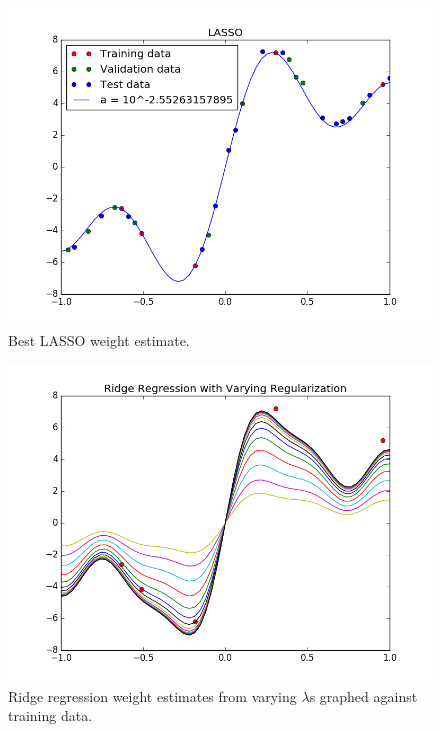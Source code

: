 \documentclass[a4paper,twoside]{article}
\begin{document}
\begin{figure}[b!]
  \includegraphics[width=\linewidth]{../Figures/P4/lasso_best.png}
  \caption{Best LASSO weight estimate.}
  \label{fig:lasso_best}
\end{figure}

\begin{figure}[b!]
  \includegraphics[width=\linewidth]{../Figures/P4/ridge_varying.png}
  \caption{Ridge regression weight estimates from varying $\lambda$s graphed against training data.}
  \label{fig:ridge_varying}
\end{figure}
\end{document}
